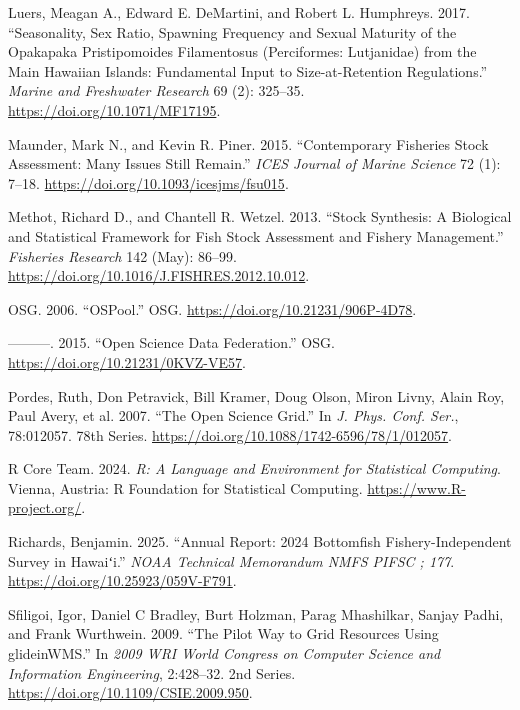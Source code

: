 \documentclass[
  letterpaper,
  12pt,
  letterpaper]{report}
\newlength{\cslhangindent}
\newenvironment{CSLReferences}[2] %
 {\begin{list}{}{%
  \setlength{\itemindent}{0pt}
  \setlength{\leftmargin}{0pt}
  \setlength{\parsep}{0pt}
  \ifodd #1
   \setlength{\leftmargin}{\cslhangindent}
   \setlength{\itemindent}{-1\cslhangindent}
  \fi
  \setlength{\itemsep}{#2\baselineskip}}}
 {\end{list}}
\begin{document}
\begin{CSLReferences}{1}{0}
Luers, Meagan A., Edward E. DeMartini, and Robert L. Humphreys. 2017.
{``Seasonality, Sex Ratio, Spawning Frequency and Sexual Maturity of the
Opakapaka {Pristipomoides} Filamentosus ({Perciformes}: {Lutjanidae})
from the {Main} {Hawaiian} {Islands}: Fundamental Input to
Size-at-Retention Regulations.''} \emph{Marine and Freshwater Research}
69 (2): 325--35. \url{https://doi.org/10.1071/MF17195}.

Maunder, Mark N., and Kevin R. Piner. 2015. {``Contemporary Fisheries
Stock Assessment: Many Issues Still Remain.''} \emph{ICES Journal of
Marine Science} 72 (1): 7--18.
\url{https://doi.org/10.1093/icesjms/fsu015}.

Methot, Richard D., and Chantell R. Wetzel. 2013. {``Stock Synthesis:
{A} Biological and Statistical Framework for Fish Stock Assessment and
Fishery Management.''} \emph{Fisheries Research} 142 (May): 86--99.
\url{https://doi.org/10.1016/J.FISHRES.2012.10.012}.

OSG. 2006. {``OSPool.''} OSG. \url{https://doi.org/10.21231/906P-4D78}.

---------. 2015. {``Open Science Data Federation.''} OSG.
\url{https://doi.org/10.21231/0KVZ-VE57}.

Pordes, Ruth, Don Petravick, Bill Kramer, Doug Olson, Miron Livny, Alain
Roy, Paul Avery, et al. 2007. {``The Open Science Grid.''} In \emph{J.
Phys. Conf. Ser.}, 78:012057. 78th Series.
\url{https://doi.org/10.1088/1742-6596/78/1/012057}.

R Core Team. 2024. \emph{R: A Language and Environment for Statistical
Computing}. Vienna, Austria: R Foundation for Statistical Computing.
\url{https://www.R-project.org/}.

Richards, Benjamin. 2025. {``Annual {Report}: 2024 {Bottomfish}
{Fishery}-{Independent} {Survey} in {Hawaiʻi}.''} \emph{NOAA Technical
Memorandum NMFS PIFSC ; 177}. \url{https://doi.org/10.25923/059V-F791}.

Sfiligoi, Igor, Daniel C Bradley, Burt Holzman, Parag Mhashilkar, Sanjay
Padhi, and Frank Wurthwein. 2009. {``The Pilot Way to Grid Resources
Using glideinWMS.''} In \emph{2009 WRI World Congress on Computer
Science and Information Engineering}, 2:428--32. 2nd Series.
\url{https://doi.org/10.1109/CSIE.2009.950}.


\end{CSLReferences}
\end{document}
